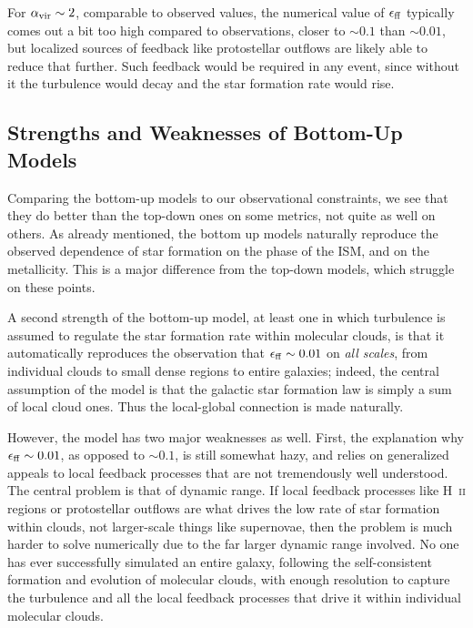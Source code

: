 For $\alpha_{\rm vir} \sim 2$, comparable to observed values, the numerical value of $\epsilon_{\rm ff}$ typically comes out a bit too high compared to observations, closer to $\sim 0.1$ than $\sim 0.01$, but localized sources of feedback like protostellar outflows are likely able to reduce that further. Such feedback would be required in any event, since without it the turbulence would decay and the star formation rate would rise.

\subsection{Strengths and Weaknesses of Bottom-Up Models}

Comparing the bottom-up models to our observational constraints, we see that they do better than the top-down ones on some metrics, not quite as well on others. As already mentioned, the bottom up models naturally reproduce the observed dependence of star formation on the phase of the ISM, and on the metallicity. This is a major difference from the top-down models, which struggle on these points.

A second strength of the bottom-up model, at least one in which turbulence is assumed to regulate the star formation rate within molecular clouds, is that it automatically reproduces the observation that $\epsilon_{\rm ff} \sim 0.01$ on \textit{all scales}, from individual clouds to small dense regions to entire galaxies; indeed, the central assumption of the model is that the galactic star formation law is simply a sum of local cloud ones. Thus the local-global connection is made naturally.

However, the model has two major weaknesses as well. First, the explanation why $\epsilon_{\rm ff} \sim 0.01$, as opposed to $\sim 0.1$, is still somewhat hazy, and relies on generalized appeals to local feedback processes that are not tremendously well understood. The central problem is that of dynamic range. If local feedback processes like H~\textsc{ii} regions or protostellar outflows are what drives the low rate of star formation within clouds, not larger-scale things like supernovae, then the problem is much harder to solve numerically due to the far larger dynamic range involved. No one has ever successfully simulated an entire galaxy, following the self-consistent formation and evolution of molecular clouds, with enough resolution to capture the turbulence and all the local feedback processes that drive it within individual molecular clouds.

